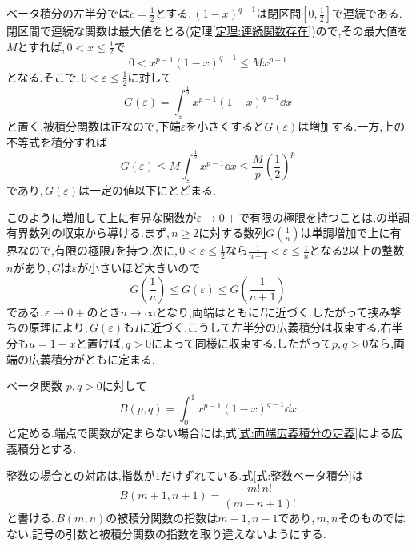 ベータ積分の左半分では$c=\frac12$とする.\,$(1-x)^{q-1}$は閉区間$\left[0,\frac12\right]$で連続である.閉区間で連続な関数は最大値をとる(定理\ref{定理:連続関数存在})ので,その最大値を$M$とすれば,\,$0<x\le\frac12$で
\[
 0<x^{p-1}(1-x)^{q-1}\le Mx^{p-1}
\]
となる.そこで,\,$0<\varepsilon\le\frac12$に対して
\[
 G(\varepsilon)=\int_{\varepsilon}^{\frac12}x^{p-1}(1-x)^{q-1}\dd x
\]
と置く.被積分関数は正なので,下端$\varepsilon$を小さくすると$G(\varepsilon)$は増加する.一方,上の不等式を積分すれば
\[
 G(\varepsilon)\le M\int_{\varepsilon}^{\frac12}x^{p-1}\dd x
 \le\frac{M}{p}\left(\frac12\right)^p
\]
であり,\,$G(\varepsilon)$は一定の値以下にとどまる.

このように増加して上に有界な関数が$\varepsilon\to0+$で有限の極限を持つことは,の単調有界数列の収束から導ける.まず,\,$n\ge2$に対する数列$G\left(\frac1n\right)$は単調増加で上に有界なので,有限の極限$I$を持つ.次に,\,$0<\varepsilon\le\frac12$なら$\frac1{n+1}<\varepsilon\le\frac1n$となる$2$以上の整数$n$があり,\,$G$は$\varepsilon$が小さいほど大きいので
\[
 G\left(\frac1n\right)\le G(\varepsilon)\le G\left(\frac1{n+1}\right)
\]
である.\,$\varepsilon\to0+$のとき$n\to\infty$となり,両端はともに$I$に近づく.したがって挟み撃ちの原理により,\,$G(\varepsilon)$も$I$に近づく.こうして左半分の広義積分は収束する.右半分も$u=1-x$と置けば,\,$q>0$によって同様に収束する.したがって$p,q>0$なら,両端の広義積分がともに定まる.

\begin{definition}{ベータ関数}
$p,q>0$に対して
\begin{equation}\label{式:ベータ関数の定義}
 B(p,q)=\int_0^1x^{p-1}(1-x)^{q-1}\dd x
\end{equation}
と定める.端点で関数が定まらない場合には,式\eqref{式:両端広義積分の定義}による広義積分とする.
\end{definition}

整数の場合との対応は,指数が$1$だけずれている.式\eqref{式:整数ベータ積分}は
\[
 B(m+1,n+1)=\frac{m!\,n!}{(m+n+1)!}
\]
と書ける.\,$B(m,n)$の被積分関数の指数は$m-1,n-1$であり,\,$m,n$そのものではない.記号の引数と被積分関数の指数を取り違えないようにする.
